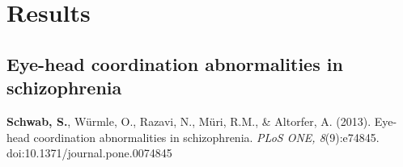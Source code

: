 \chapter{Results}
\label{chap:results}

\section{Eye-head coordination abnormalities in schizophrenia}
\textbf{Schwab, S.}, Würmle, O., Razavi, N., Müri, R.M., \& Altorfer, A. (2013). Eye-head coordination abnormalities in schizophrenia. \textit{PLoS ONE, 8}(9):e74845. doi:10.1371/journal.pone.0074845
%
